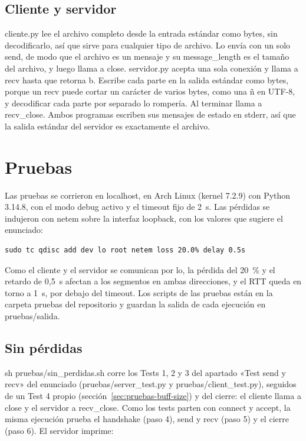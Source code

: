 \documentclass[
	spanish, %
	letterpaper, oneside
]{article}
\newcommand{\code}[1]{#1}     %
\newcommand{\field}[1]{#1}    %
\begin{document}
\subsection{Cliente y servidor}
\code{cliente.py} lee el archivo completo desde la entrada estándar como bytes, sin decodificarlo,
así que sirve para cualquier tipo de archivo. Lo envía con un solo \code{send}, de modo que el
archivo es un mensaje y su \field{message\_length} es el tamaño del archivo, y luego llama a
\code{close}. \code{servidor.py} acepta una sola conexión y llama a \code{recv} hasta que retorna
\code{b\textquotedbl\textquotedbl{}}. Escribe cada parte en la salida estándar como bytes, porque
un \code{recv} puede cortar un carácter de varios bytes, como una ñ en UTF-8, y decodificar cada
parte por separado lo rompería. Al terminar llama a \code{recv\_close}. Ambos programas escriben
sus mensajes de estado en stderr, así que la salida estándar del servidor es exactamente el
archivo.

\section{Pruebas}
Las pruebas se corrieron en localhost, en Arch Linux (kernel 7.2.9) con Python 3.14.8, con el modo
debug activo y el timeout fijo de 2~s. Las pérdidas se indujeron con netem sobre la interfaz
loopback, con los valores que sugiere el enunciado:

{\small
\begin{verbatim}
sudo tc qdisc add dev lo root netem loss 20.0% delay 0.5s
\end{verbatim}}

Como el cliente y el servidor se comunican por lo, la pérdida del 20~\% y el retardo de 0,5~s
afectan a los segmentos en ambas direcciones, y el RTT queda en torno a 1~s, por debajo del
timeout. Los scripts de las pruebas están en la carpeta \code{pruebas} del repositorio y guardan
la salida de cada ejecución en \code{pruebas/salida}.

\subsection{Sin pérdidas}
\code{sh pruebas/sin\_perdidas.sh} corre los Tests 1, 2 y 3 del apartado «Test send y recv» del
enunciado (\code{pruebas/server\_test.py} y \code{pruebas/client\_test.py}), seguidos de un Test 4
propio (sección~\ref{sec:pruebas-buff-size}) y del cierre: el cliente llama a \code{close} y el
servidor a \code{recv\_close}. Como los tests parten con \code{connect} y \code{accept}, la misma
ejecución prueba el handshake (paso 4), \code{send} y \code{recv} (paso 5) y el cierre (paso 6). El
servidor imprime:
\end{document}
